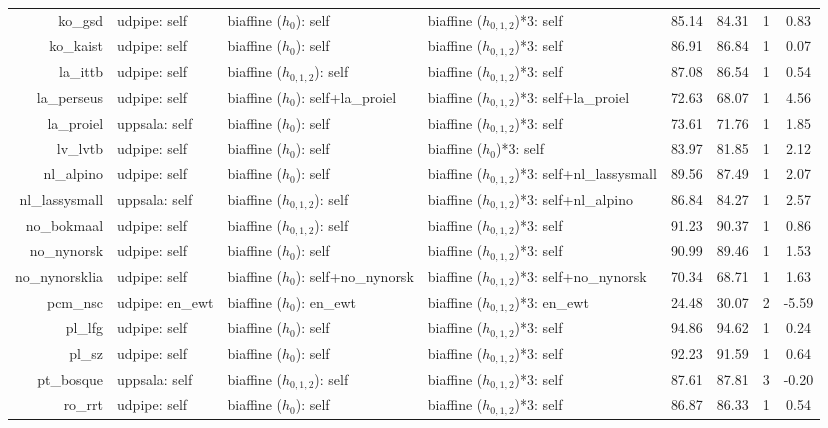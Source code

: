 \documentclass[11pt,a4paper]{article}
\begin{document}
\begin{table}[t]
\begin{tabular}{rlllcccc}
		ko\_gsd & udpipe: self & biaffine ($h_{0}$): self & biaffine ($h_{0,1,2}$)*3: self & 85.14 & 84.31 & 1 & 0.83 \\
		ko\_kaist & udpipe: self & biaffine ($h_{0}$): self & biaffine ($h_{0,1,2}$)*3: self & 86.91 & 86.84 & 1 & 0.07 \\
		la\_ittb & udpipe: self & biaffine ($h_{0,1,2}$): self & biaffine ($h_{0,1,2}$)*3: self & 87.08 & 86.54 & 1 & 0.54 \\
		la\_perseus & udpipe: self & biaffine ($h_{0}$): self+la\_proiel & biaffine ($h_{0,1,2}$)*3: self+la\_proiel & 72.63 & 68.07 & 1 & 4.56 \\
		la\_proiel & uppsala: self & biaffine ($h_{0}$): self & biaffine ($h_{0,1,2}$)*3: self & 73.61 & 71.76 & 1 & 1.85 \\
		lv\_lvtb & udpipe: self & biaffine ($h_{0}$): self & biaffine ($h_{0}$)*3: self & 83.97 & 81.85 & 1 & 2.12 \\
		nl\_alpino & udpipe: self & biaffine ($h_{0}$): self & biaffine ($h_{0,1,2}$)*3: self+nl\_lassysmall & 89.56 & 87.49 & 1 & 2.07 \\
		nl\_lassysmall & uppsala: self & biaffine ($h_{0,1,2}$): self & biaffine ($h_{0,1,2}$)*3: self+nl\_alpino & 86.84 & 84.27 & 1 & 2.57 \\
		no\_bokmaal & udpipe: self & biaffine ($h_{0,1,2}$): self & biaffine ($h_{0,1,2}$)*3: self & 91.23 & 90.37 & 1 & 0.86 \\
		no\_nynorsk & udpipe: self & biaffine ($h_{0}$): self & biaffine ($h_{0,1,2}$)*3: self & 90.99 & 89.46 & 1 & 1.53 \\
		no\_nynorsklia & udpipe: self & biaffine ($h_{0}$): self+no\_nynorsk & biaffine ($h_{0,1,2}$)*3: self+no\_nynorsk & 70.34 & 68.71 & 1 & 1.63 \\
		pcm\_nsc & udpipe: en\_ewt & biaffine ($h_{0}$): en\_ewt & biaffine ($h_{0,1,2}$)*3: en\_ewt & 24.48 & 30.07 & 2 & -5.59 \\
		pl\_lfg & udpipe: self & biaffine ($h_{0}$): self & biaffine ($h_{0,1,2}$)*3: self & 94.86 & 94.62 & 1 & 0.24 \\
		pl\_sz & udpipe: self & biaffine ($h_{0}$): self & biaffine ($h_{0,1,2}$)*3: self & 92.23 & 91.59 & 1 & 0.64 \\
		pt\_bosque & uppsala: self & biaffine ($h_{0,1,2}$): self & biaffine ($h_{0,1,2}$)*3: self & 87.61 & 87.81 & 3 & -0.20 \\
		ro\_rrt & udpipe: self & biaffine ($h_{0}$): self & biaffine ($h_{0,1,2}$)*3: self & 86.87 & 86.33 & 1 & 0.54 \\

\end{tabular}
\end{table}
\end{document}
